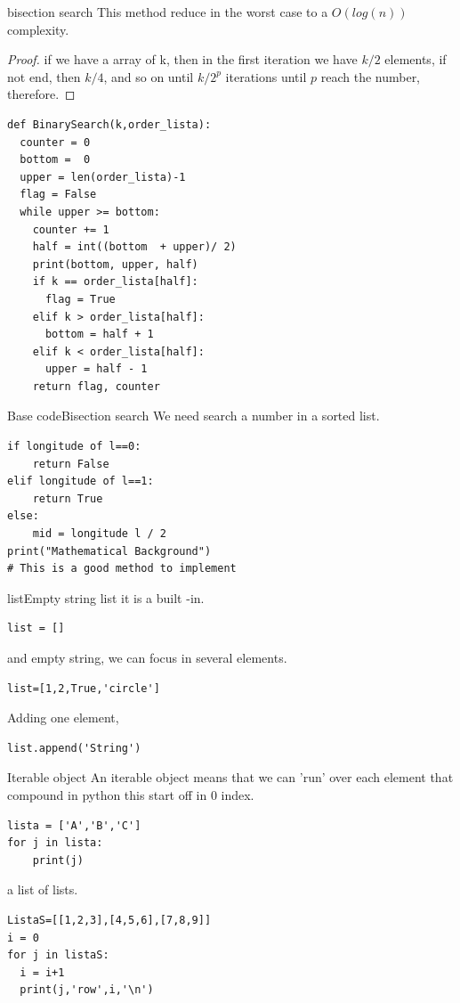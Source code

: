 \documentclass{beamer}
\begin{document}
\begin{frame}{bisection search}
This method reduce in the worst case to a $O(log(n))$ complexity.
\begin{proof}
if we have a array of k, then in the first iteration we have 
$k/2$ elements, if not end, then $k/4$, and so on until $k/2^{p}$ iterations until $p$ reach the number, therefore. 
\end{proof}
\end{frame}

\begin{frame}[fragile]
\begin{lstlisting}
def BinarySearch(k,order_lista):
  counter = 0
  bottom =  0
  upper = len(order_lista)-1
  flag = False
  while upper >= bottom:
    counter += 1
    half = int((bottom  + upper)/ 2)
    print(bottom, upper, half)
    if k == order_lista[half]:
      flag = True
    elif k > order_lista[half]:
      bottom = half + 1
    elif k < order_lista[half]:
      upper = half - 1
    return flag, counter
\end{lstlisting}
\end{frame}


\begin{frame}[fragile]{Base code}{Bisection search}
We need search a number in a sorted list.
\begin{lstlisting}
if longitude of l==0:
	return False
elif longitude of l==1:
	return True
else:
	mid = longitude l / 2
print("Mathematical Background")
# This is a good method to implement 
\end{lstlisting}
\end{frame}




\begin{frame}[fragile]{list}{Empty string}
list it is a built -in.
\begin{lstlisting}
list = []
\end{lstlisting}
and empty string, we can focus in several elements.

\begin{lstlisting}
list=[1,2,True,'circle']
\end{lstlisting}
Adding one element, 
\begin{lstlisting}
list.append('String')
\end{lstlisting}
\end{frame}

\begin{frame}[fragile]{Iterable object}
An iterable object means that we can 'run' over each element that compound in python this start off in 0 index.

\begin{lstlisting}
lista = ['A','B','C']
for j in lista:
	print(j)
\end{lstlisting}
a list of lists. 

\begin{lstlisting}
ListaS=[[1,2,3],[4,5,6],[7,8,9]]
i = 0 
for j in listaS:
  i = i+1
  print(j,'row',i,'\n')
\end{lstlisting}
\end{frame}
\end{document}
